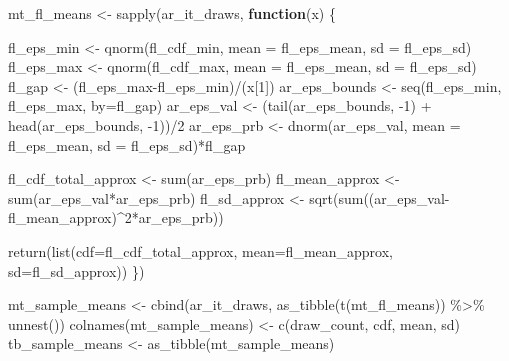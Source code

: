 \documentclass[
]{book}
\newenvironment{Shaded}{\begin{snugshade}}{\end{snugshade}}
\newcommand{\AttributeTok}[1]{\textcolor[rgb]{0.77,0.63,0.00}{#1}}
\newcommand{\ControlFlowTok}[1]{\textcolor[rgb]{0.13,0.29,0.53}{\textbf{#1}}}
\newcommand{\DecValTok}[1]{\textcolor[rgb]{0.00,0.00,0.81}{#1}}
\newcommand{\FunctionTok}[1]{\textcolor[rgb]{0.00,0.00,0.00}{#1}}
\newcommand{\NormalTok}[1]{#1}
\newcommand{\OtherTok}[1]{\textcolor[rgb]{0.56,0.35,0.01}{#1}}
\newcommand{\SpecialCharTok}[1]{\textcolor[rgb]{0.00,0.00,0.00}{#1}}
\newcommand{\StringTok}[1]{\textcolor[rgb]{0.31,0.60,0.02}{#1}}
\begin{document}
\begin{Shaded}
\begin{Highlighting}[]
\NormalTok{mt\_fl\_means }\OtherTok{\textless{}{-}}
  \FunctionTok{sapply}\NormalTok{(ar\_it\_draws, }\ControlFlowTok{function}\NormalTok{(x) \{}

\NormalTok{    fl\_eps\_min }\OtherTok{\textless{}{-}} \FunctionTok{qnorm}\NormalTok{(fl\_cdf\_min, }\AttributeTok{mean =}\NormalTok{ fl\_eps\_mean, }\AttributeTok{sd =}\NormalTok{ fl\_eps\_sd)}
\NormalTok{    fl\_eps\_max }\OtherTok{\textless{}{-}} \FunctionTok{qnorm}\NormalTok{(fl\_cdf\_max, }\AttributeTok{mean =}\NormalTok{ fl\_eps\_mean, }\AttributeTok{sd =}\NormalTok{ fl\_eps\_sd)}
\NormalTok{    fl\_gap }\OtherTok{\textless{}{-}}\NormalTok{ (fl\_eps\_max}\SpecialCharTok{{-}}\NormalTok{fl\_eps\_min)}\SpecialCharTok{/}\NormalTok{(x[}\DecValTok{1}\NormalTok{])}
\NormalTok{    ar\_eps\_bounds }\OtherTok{\textless{}{-}} \FunctionTok{seq}\NormalTok{(fl\_eps\_min, fl\_eps\_max, }\AttributeTok{by=}\NormalTok{fl\_gap)}
\NormalTok{    ar\_eps\_val }\OtherTok{\textless{}{-}}\NormalTok{ (}\FunctionTok{tail}\NormalTok{(ar\_eps\_bounds, }\SpecialCharTok{{-}}\DecValTok{1}\NormalTok{) }\SpecialCharTok{+} \FunctionTok{head}\NormalTok{(ar\_eps\_bounds, }\SpecialCharTok{{-}}\DecValTok{1}\NormalTok{))}\SpecialCharTok{/}\DecValTok{2}
\NormalTok{    ar\_eps\_prb }\OtherTok{\textless{}{-}} \FunctionTok{dnorm}\NormalTok{(ar\_eps\_val, }\AttributeTok{mean =}\NormalTok{ fl\_eps\_mean, }\AttributeTok{sd =}\NormalTok{ fl\_eps\_sd)}\SpecialCharTok{*}\NormalTok{fl\_gap}

\NormalTok{    fl\_cdf\_total\_approx }\OtherTok{\textless{}{-}} \FunctionTok{sum}\NormalTok{(ar\_eps\_prb)}
\NormalTok{    fl\_mean\_approx }\OtherTok{\textless{}{-}} \FunctionTok{sum}\NormalTok{(ar\_eps\_val}\SpecialCharTok{*}\NormalTok{ar\_eps\_prb)}
\NormalTok{    fl\_sd\_approx }\OtherTok{\textless{}{-}} \FunctionTok{sqrt}\NormalTok{(}\FunctionTok{sum}\NormalTok{((ar\_eps\_val}\SpecialCharTok{{-}}\NormalTok{fl\_mean\_approx)}\SpecialCharTok{\^{}}\DecValTok{2}\SpecialCharTok{*}\NormalTok{ar\_eps\_prb))}

    \FunctionTok{return}\NormalTok{(}\FunctionTok{list}\NormalTok{(}\AttributeTok{cdf=}\NormalTok{fl\_cdf\_total\_approx, }\AttributeTok{mean=}\NormalTok{fl\_mean\_approx, }\AttributeTok{sd=}\NormalTok{fl\_sd\_approx))}
\NormalTok{  \})}

\NormalTok{mt\_sample\_means }\OtherTok{\textless{}{-}} \FunctionTok{cbind}\NormalTok{(ar\_it\_draws, }\FunctionTok{as\_tibble}\NormalTok{(}\FunctionTok{t}\NormalTok{(mt\_fl\_means)) }\SpecialCharTok{\%\textgreater{}\%} \FunctionTok{unnest}\NormalTok{())}
\FunctionTok{colnames}\NormalTok{(mt\_sample\_means) }\OtherTok{\textless{}{-}} \FunctionTok{c}\NormalTok{(}\StringTok{\textquotesingle{}draw\_count\textquotesingle{}}\NormalTok{, }\StringTok{\textquotesingle{}cdf\textquotesingle{}}\NormalTok{, }\StringTok{\textquotesingle{}mean\textquotesingle{}}\NormalTok{, }\StringTok{\textquotesingle{}sd\textquotesingle{}}\NormalTok{)}
\NormalTok{tb\_sample\_means }\OtherTok{\textless{}{-}} \FunctionTok{as\_tibble}\NormalTok{(mt\_sample\_means)}


\end{Highlighting}
\end{Shaded}
\end{document}
